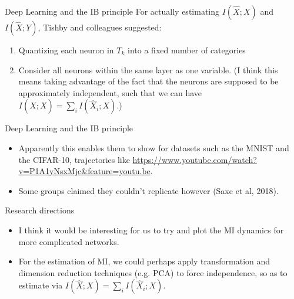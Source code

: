 \documentclass{beamer}
\begin{document}
\begin{frame}{Deep Learning and the IB principle}
For actually estimating $I(\hat{X}; X)$ and $I(\hat{X}; Y)$, Tishby and colleagues suggested: 
\begin{enumerate}
	\item Quantizing each neuron in $T_k$ into a fixed number of categories
	\item Consider all neurons within the same layer as one variable. (I think this means taking advantage of the fact that the neurons are supposed to be approximately independent, such that we can have $I(\hat{X};X)=\sum_i I(\hat{X}_i;X)$.)
\end{enumerate}
\end{frame}

\begin{frame}{Deep Learning and the IB principle}
\begin{itemize}
	\item Apparently this enables them to show for datasets such as the MNIST and the CIFAR-10, trajectories like {\small \url{https://www.youtube.com/watch?v=P1A1yNsxMjc&feature=youtu.be}}. 
	\item Some groups claimed they couldn't replicate however (Saxe et al, 2018). 
\end{itemize}
\end{frame}

\begin{frame}{Research directions}
\begin{itemize}
	\item I think it would be interesting for us to try and plot the MI dynamics for more complicated networks. 
	\item For the estimation of MI, we could perhaps apply transformation and dimension reduction techniques (e.g. PCA) to force independence, so as to estimate via $I(\hat{X};X)=\sum_i I(\hat{X}_i;X)$.
\end{itemize}
\end{frame}
\end{document}
